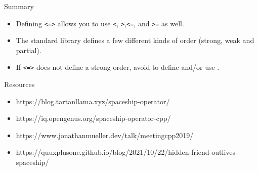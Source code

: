 \begin{frame}[fragile]
  \begin{alertblock}{Summary}
    \begin{itemize}
      \item Defining \texttt{<=>} allows you to use \texttt{<}, \texttt{>},\texttt{<=}, and \texttt{>=} as well.
      \item The standard library defines a few different kinds of order (strong, weak and partial).
      \item If \texttt{<=>} does not define a strong order, avoid to define and/or use .
    \end{itemize}
  \end{alertblock}
  \begin{block}{Resources}
    \begin{itemize}
      \item https://blog.tartanllama.xyz/spaceship-operator/
      \item https://iq.opengenus.org/spaceship-operator-cpp/
      \item https://www.jonathanmueller.dev/talk/meetingcpp2019/
      \item https://quuxplusone.github.io/blog/2021/10/22/hidden-friend-outlives-spaceship/
    \end{itemize}
  \end{block}
\end{frame}
